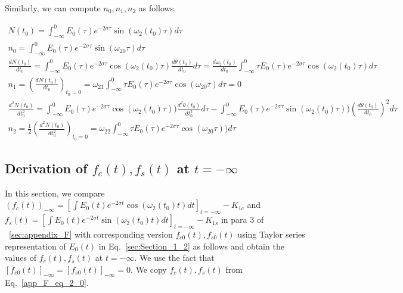\documentclass[11pt]{elsarticle}
\begin{document}
Similarly, we can compute $n_0, n_1, n_2$ as follows.

\begin{eqnarray*}\label{app_F_4_eq_2}   
N(t_0) = \int_{-\infty}^{0}    E_0(\tau)e^{-2 \sigma \tau}  \sin{ (\omega_2(t_0) \tau)} d\tau \\
n_0 = \int_{-\infty}^{0}    E_0(\tau)e^{-2 \sigma \tau} \sin{ (\omega_{20} \tau)} d\tau \\
\frac{dN(t_0)}{dt_0} =  \int_{-\infty}^{0}    E_0(\tau)e^{-2 \sigma \tau} \cos{ (\omega_2(t_0) \tau)} \frac{d\theta(t_0)}{dt_0}  d\tau = \frac{d\omega_2(t_0)}{dt_0} \int_{-\infty}^{0}  \tau   E_0(\tau)e^{-2 \sigma \tau} \cos{ (\omega_2(t_0) \tau)}   d\tau  \\
n_1 = (\frac{dN(t_0)}{dt_0})_{t_0=0} =   \omega_{21} \int_{-\infty}^{0}  \tau   E_0(\tau)e^{-2 \sigma \tau} \cos{ (\omega_{20} \tau)}  d\tau = 0 \\
\frac{d^{2}N(t_0)}{dt_0^{2}} =  \int_{-\infty}^{0}    E_0(\tau)e^{-2 \sigma \tau}  \cos{ (\omega_2(t_0) \tau)}) \frac{d^{2}\theta(t_0)}{dt_0^{2}}  d\tau - \int_{-\infty}^{0}    E_0(\tau)e^{-2 \sigma \tau} \sin{ (\omega_2(t_0) \tau)}) (\frac{d\theta(t_0)}{dt_0})^{2}  d\tau  \\
n_2 = \frac{1}{2}  (\frac{d^{2}N(t_0)}{dt_0^{2}})_{t_0=0} =   \omega_{22} \int_{-\infty}^{0}  \tau  E_0(\tau)e^{-2 \sigma \tau}  \cos{ (\omega_{20} \tau)}) d\tau   
\end{eqnarray*}
\begin{equation} \end{equation}



\subsection{\label{sec:Appendix_F_7} \textbf{ Derivation of $f_c(t), f_s(t)$ at $t=-\infty$ } \protect\\  \lowercase{} }


In this section, we compare $(f_{c}(t))_{-\infty} = [\int    E_0(t) e^{-2 \sigma t}  \cos{ ( \omega_2(t_0) t)} dt ]_{t=-\infty} -K_{1c}$ and \\$f_s(t)=  [\int    E_0(t) e^{-2 \sigma t}  \sin{ ( \omega_2(t_0) t)} dt ]_{t=-\infty}  -K_{1s} $  in para 3 of ~\ref{sec:appendix_F} with corresponding version $f_{c0}(t), f_{s0}(t)$ using Taylor series representation of $E_0(t)$ in Eq.~\ref{sec:Section_1_2}  as follows and obtain the values of  $f_c(t), f_s(t)$ at $t=-\infty$. We use the fact that $[f_{c0}(t)]_{-\infty} = [f_{s0}(t)]_{-\infty} = 0$. We copy $f_c(t), f_s(t)$ from Eq.~\ref{app_F_eq_2_0}.\\
\end{document}
